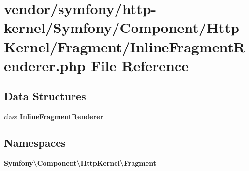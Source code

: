 \section{vendor/symfony/http-\/kernel/\+Symfony/\+Component/\+Http\+Kernel/\+Fragment/\+Inline\+Fragment\+Renderer.php File Reference}
\label{_inline_fragment_renderer_8php}
\subsection*{Data Structures}
\begin{DoxyCompactItemize}
\item 
class {\bf Inline\+Fragment\+Renderer}
\end{DoxyCompactItemize}
\subsection*{Namespaces}
\begin{DoxyCompactItemize}
\item 
 {\bf Symfony\textbackslash{}\+Component\textbackslash{}\+Http\+Kernel\textbackslash{}\+Fragment}
\end{DoxyCompactItemize}

